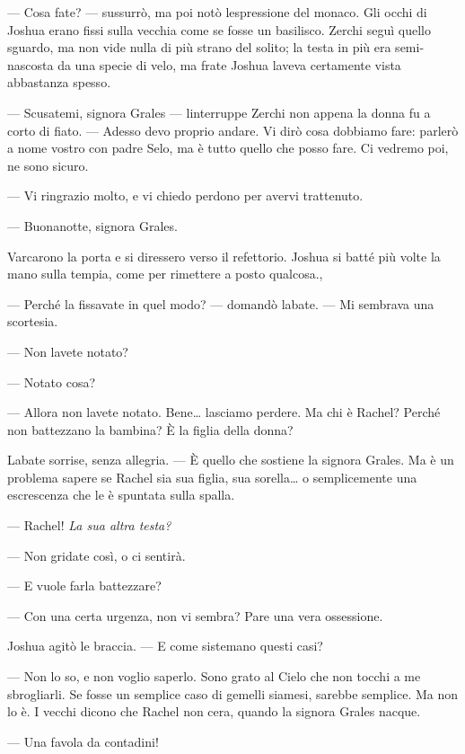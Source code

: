 --- Cosa fate? --- sussurrò, ma poi notò l\textquotesingle espressione
del monaco. Gli occhi di Joshua erano fissi sulla vecchia come se fosse
un basilisco. Zerchi seguì quello sguardo, ma non vide nulla di più
strano del solito; la testa in più era semi-nascosta da una specie di
velo, ma frate Joshua l\textquotesingle aveva certamente vista
abbastanza spesso.

--- Scusatemi, signora Grales --- l\textquotesingle interruppe Zerchi
non appena la donna fu a corto di fiato. --- Adesso devo proprio andare.
Vi dirò cosa dobbiamo fare: parlerò a nome vostro con padre Selo, ma è
tutto quello che posso fare. Ci vedremo poi, ne sono sicuro.

--- Vi ringrazio molto, e vi chiedo perdono per avervi trattenuto.

--- Buonanotte, signora Grales.

Varcarono la porta e si diressero verso il refettorio. Joshua si batté
più volte la mano sulla tempia, come per rimettere a posto qualcosa.,

--- Perché la fissavate in quel modo? --- domandò
l\textquotesingle abate. --- Mi sembrava una scortesia.

--- Non l\textquotesingle avete notato?

--- Notato cosa?

--- Allora non l\textquotesingle avete notato. Bene\ldots{} lasciamo
perdere. Ma chi è Rachel? Perché non battezzano la bambina? È la figlia
della donna?

L\textquotesingle abate sorrise, senza allegria. --- È quello che
sostiene la signora Grales. Ma è un problema sapere se Rachel sia sua
figlia, sua sorella\ldots{} o semplicemente una escrescenza che le è
spuntata sulla spalla.

--- Rachel! \emph{La sua altra testa?}

--- Non gridate così, o ci sentirà.

--- E vuole farla battezzare?

--- Con una certa urgenza, non vi sembra? Pare una vera ossessione.

Joshua agitò le braccia. --- E come sistemano questi casi?

--- Non lo so, e non voglio saperlo. Sono grato al Cielo che non tocchi
a me sbrogliarli. Se fosse un semplice caso di gemelli siamesi, sarebbe
semplice. Ma non lo è. I vecchi dicono che Rachel non
c\textquotesingle era, quando la signora Grales nacque.

--- Una favola da contadini!

